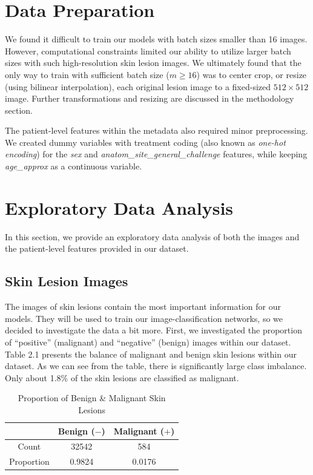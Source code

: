 \documentclass [MAS] {uclathes}
\begin{document}
\section{Data Preparation}

We found it difficult to train our models with batch sizes smaller than 16 images. However, computational constraints limited our ability to utilize larger batch sizes with such high-resolution skin lesion images. We ultimately found that the only way to train with sufficient batch size ($m \geq 16$) was to center crop, or resize (using bilinear interpolation), each original lesion image to a fixed-sized $512 \times 512$ image. Further transformations and resizing are discussed in the methodology section.

The patient-level features within the metadata also required minor preprocessing. We created dummy variables with treatment coding (also known as \textit{one-hot encoding}) for the \textit{sex} and \textit{anatom\_site\_general\_challenge} features, while keeping \textit{age\_approx} as a continuous variable.


\section{Exploratory Data Analysis}

In this section, we provide an exploratory data analysis of both the images and the patient-level features provided in our dataset.

\subsection{Skin Lesion Images}

The images of skin lesions contain the most important information for our models. They will be used to train our image-classification networks, so we decided to investigate the data a bit more. First, we investigated the proportion of ``positive'' (malignant) and ``negative'' (benign) images within our dataset. Table 2.1 presents the balance of malignant and benign skin lesions within our dataset. As we can see from the table, there is significantly large class imbalance. Only about 1.8\% of the skin lesions are classified as malignant. 

\begin{table}[h!]
\centering
\begin{tabular}{| c | c | c |} 
\hline
& Benign ($-$) & Malignant ($+$) \\ 
\hline
\hline
Count & 32542 & 584\\
\hline
Proportion & 0.9824 & 0.0176\\
\hline  
\end{tabular}
\label{tab:propMel}
\caption{Proportion of Benign \& Malignant Skin Lesions}
\end{table}
\end{document}
